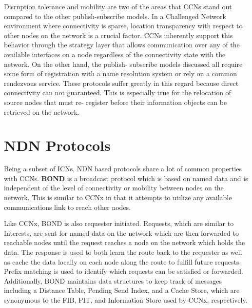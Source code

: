 \documentclass[a4paper,12pt]{report}      %
\begin{document}
\begin{descripton}
Disruption tolerance and mobility are two of the areas that CCNs stand out compared to the other
publish-subscribe models. In a Challenged Network environment where connectivity is sparse, location
transparency with respect to other nodes on the network is a crucial factor. CCNs inherently support
this behavior through the strategy layer that allows communication over any of the available interfaces
on a node regardless of the connectivity state with the network. On the other hand, the publish-
subscribe models discussed all require some form of registration with a name resolution system or rely
on a common rendezvous service. These protocols suffer greatly in this regard because direct
connectivity can not guaranteed. This is especially true for the relocation of source nodes that must re-
register before their information objects can be retrieved on the network.\cite{dirk2941}

\section{NDN Protocols}

Being a subset of ICNs, NDN based protocols share a lot of common properties with CCNs.
\textbf{BOND} \cite{bond} is a broadcast protocol which is based on named data and is independent of the
level of connectivity or mobility between nodes on the network. This is similar to CCNx in that it
attempts to utilize any available communications link to reach other nodes.

Like CCNx, BOND is also requester initiated. Requests, which are similar to Interests, are sent
for named data on the network which are then forwarded to reachable nodes until the request reaches a
node on the network which holds the data. The response is used to both learn the route back to the
requester as well as cache the data locally on each node along the route to fulfill future requests. Prefix
matching is used to identify which requests can be satisfied or forwarded. Additionally, BOND
maintains data structures to keep track of messages including a Distance Table, Pending Send Index,
and a Cache Store, which are synonymous to the FIB, PIT, and Information Store used by CCNx,
respectively.


\end{descripton}
\end{document}
